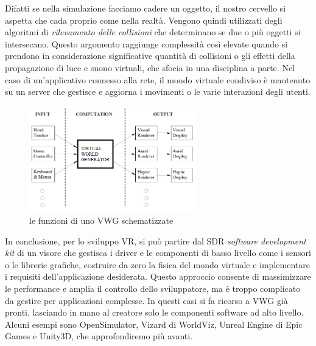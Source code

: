 Difatti se nella simulazione facciamo cadere un oggetto, il nostro cervello si aspetta che cada proprio come nella realtà. Vengono quindi utilizzati degli algoritmi di \textit{rilevamento delle collisioni} che determinano se due o più oggetti si intersecano. Questo argomento raggiunge complessità così elevate quando si prendono in considerazione significative quantità di collisioni o gli effetti della propagazione di luce e suono virtuali, che sfocia in una disciplina a parte.
Nel caso di un'applicativo connesso alla rete, il mondo virtuale condiviso è mantenuto su un server che gestisce e aggiorna i movimenti o le varie interazioni degli utenti.\\
\begin{figure}[H]
	\includegraphics[width=0.65\textwidth]{figure/SoftwareBB}
	\centering
	\caption{le funzioni di uno VWG schematizzate}
\end{figure}

In conclusione, per lo sviluppo VR, si può partire dal SDR \textit{software development kit} di un visore che gestisca i driver e le componenti di basso livello come i sensori o le librerie grafiche, costruire da zero la fisica del mondo virtuale e implementare i requisiti dell'applicazione desiderata. Questo approccio consente di massimizzare le performance e amplia il controllo dello sviluppatore, ma è troppo complicato da gestire per applicazioni complesse. In questi casi si fa ricorso a VWG già pronti, lasciando in mano al creatore solo le componenti software ad alto livello. Alcuni esempi sono OpenSimulator, Vizard di WorldViz, Unreal Engine di Epic Games e Unity3D, che approfondiremo più avanti.

